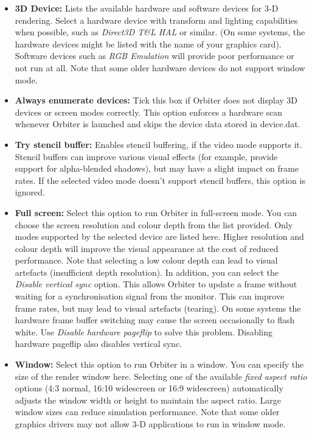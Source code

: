 \documentclass[Orbiter User Manual.tex]{subfiles}
\begin{document}
\noindent

\begin{itemize}
\item \textbf{3D Device:} Lists the available hardware and software devices for 3-D rendering. Select a hardware device with transform and lighting capabilities when possible, such as \textit{Direct3D T\&L HAL} or similar. (On some systems, the hardware devices might be listed with the name of your graphics card). Software devices such as \textit{RGB Emulation} will provide poor performance or not run at all. Note that some older hardware devices do not support window mode.
\item \textbf{Always enumerate devices:} Tick this box if Orbiter does not display 3D devices or screen modes correctly. This option enforces a hardware scan whenever Orbiter is launched and skips the device data stored in device.dat.
\item \textbf{Try stencil buffer:} Enables stencil buffering, if the video mode supports it. Stencil buffers can improve various visual effects (for example, provide support for alpha-blended shadows), but may have a slight impact on frame rates. If the selected video mode doesn't support stencil buffers, this option is ignored.
\item \textbf{Full screen:} Select this option to run Orbiter in full-screen mode. You can choose the screen resolution and colour depth from the list provided. Only modes supported by the selected device are listed here. Higher resolution and colour depth will improve the visual appearance at the cost of reduced performance. Note that selecting a low colour depth can lead to visual artefacts (insufficient depth resolution).\newline
In addition, you can select the \textit{Disable vertical sync} option. This allows Orbiter to update a frame without waiting for a synchronisation signal from the monitor. This can improve frame rates, but may lead to visual artefacts (tearing).\newline
On some systems the hardware frame buffer switching may cause the screen occasionally to flash white. Use \textit{Disable hardware pageflip} to solve this problem. Disabling hardware pageflip also disables vertical sync.
\item \textbf{Window:} Select this option to run Orbiter in a window. You can specify the size of the render window here. Selecting one of the available \textit{fixed aspect ratio} options (4:3 normal, 16:10 widescreen or 16:9 widescreen) automatically adjusts the window width or height to maintain the aspect ratio. Large window sizes can reduce simulation performance. Note that some older graphics drivers may not allow 3-D applications to run in window mode.
\end{itemize}
\end{document}
